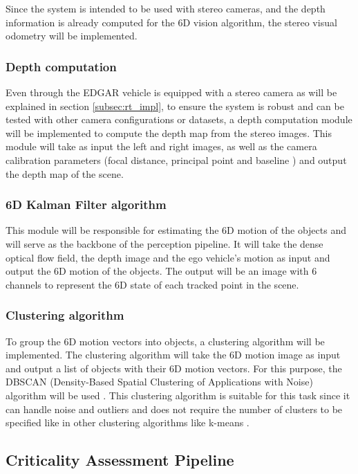 Since the system is intended to be used with stereo cameras, and the depth information is already computed for the 
6D vision algorithm, the stereo visual odometry will be implemented.

\subsubsection{Depth computation}

Even through the EDGAR vehicle is equipped with a stereo camera as will be explained in section \ref{subsec:rt_impl},
to ensure the system is robust and can be tested with other camera configurations or datasets, a depth computation module will be implemented
to compute the depth map from the stereo images. This module will take as input the left and right images, as well as the camera calibration
parameters (focal distance, principal point and baseline \cite{pin_hole_camera_model}) and output the depth map of the scene.

\subsubsection{6D Kalman Filter algorithm}

This module will be responsible for estimating the 6D motion of the objects and will serve as the backbone of the perception pipeline.
It will take the dense optical flow field, the depth image and the ego vehicle's motion as input and output the 6D motion of the objects. 
The output will be an image with 6 channels to represent the 6D state of each tracked point in the scene. 
\subsubsection{Clustering algorithm}

To group the 6D motion vectors into objects, a clustering algorithm \cite{clustering_concept} will be implemented. The clustering algorithm will take the 6D motion image as input and output a list of objects with their 6D motion vectors.
For this purpose, the DBSCAN (Density-Based Spatial Clustering of Applications with Noise) algorithm will be used \cite{dbscan_concept}. This clustering
algorithm is suitable for this task since it can handle noise and outliers and does not require the number of clusters to be specified like in 
other clustering algorithms like k-means \cite{kmeans}.

\subsection{Criticality Assessment Pipeline}%

